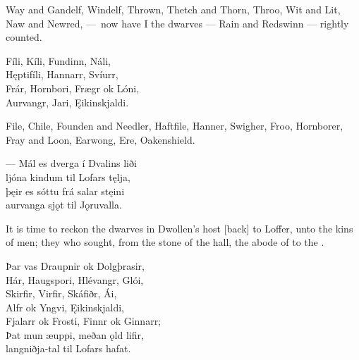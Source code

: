 \bvb Way and Gandelf, Windelf, Thrown, Thetch and Thorn, Throo, Wit and Lit, Naw and Newred, — now have I the dwarves — Rain and Redswinn — rightly counted.\evb

\bva Fíli, Kíli, \hld Fundinn, Náli, \\%
Hęptifíli, \hld Hannarr, Svíurr, \\%
Frár, Hornbori, \hld Frægr ok Lóni, \\%
Aurvangr, Jari, \hld Ęikinskjaldi.\eva

\bvb File, Chile, Founden and Needler, Haftfile, Hanner, Swigher, Froo, Hornborer, Fray and Loon, Earwong, Ere, Oakenshield.\evb

\bva — Mál es dverga \hld í Dvalins liði \\%
ljóna kindum \hld til Lofars tęlja, \\%
þęir es sóttu \hld frá salar stęini \\%
aurvanga sjǫt \hld til Jǫruvalla.\eva

\bvb It is time to reckon the dwarves in Dwollen’s host [back] to Loffer, unto the kins of men\footnotemark[1]; they who sought, from the stone of the hall, the abode of \footnotemark[2] to the .\footnotemark[3]\evb
{}

\bva Þar vas Draupnir \hld ok Dolgþrasir, \\%
Hár, Haugspori, \hld Hlévangr, Glói, \\%
Skirfir, Virfir, \hld Skáfiðr, Ái, \\%
Alfr ok Yngvi, \hld Ęikinskjaldi, \\%
Fjalarr ok Frosti, \hld Finnr ok Ginnarr; \\%
Þat mun æ\footnotemark[1] uppi, \hld meðan ǫld lifir, \\%
langniðja-tal \hld til Lofars hafat.\eva
{}

